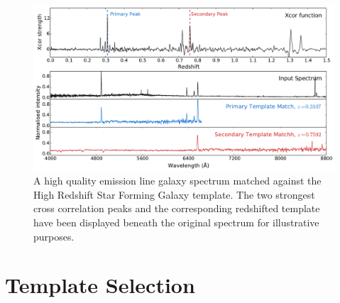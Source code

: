 \documentclass[iop]{emulateapj}
\begin{document}
\begin{figure}[t]
\centering
\includegraphics[width=\textwidth]{xcors.pdf}
\caption{A high quality emission line galaxy spectrum matched against the High Redshift Star Forming Galaxy template. The two strongest cross correlation peaks and the corresponding redshifted template have been displayed beneath the original spectrum for illustrative purposes.}
\label{fig:xcors}
\end{figure}








\section{Template Selection}
\end{document}
